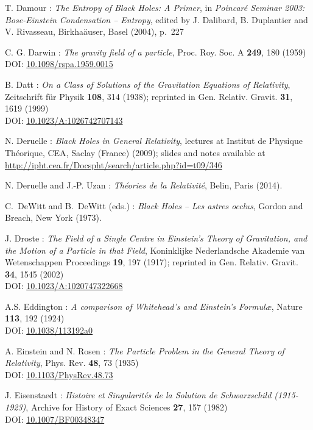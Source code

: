 \begin{thebibliography}{123}
T. Damour : {\em The Entropy of Black Holes: A Primer},
in {\em Poincaré Seminar 2003: Bose-Einstein Condensation -- Entropy},
edited by J. Dalibard, B. Duplantier and V. Rivasseau, Birkha\"auser, Basel (2004),
p.~227

C. G. Darwin : {\em The gravity field of a particle},
Proc. Roy. Soc. A {\bf 249}, 180 (1959)\\
DOI: \href{https://doi.org/10.1098/rspa.1959.0015}{10.1098/rspa.1959.0015}

B. Datt :
{\em On a Class of Solutions of the Gravitation Equations of Relativity},
Zeitschrift für Physik {\bf 108}, 314 (1938);
reprinted in Gen. Relativ. Gravit. {\bf 31}, 1619 (1999)\\
DOI: \href{https://doi.org/10.1023/10.1023/A:1026742707143}{10.1023/A:1026742707143}

N. Deruelle : {\em Black Holes in General Relativity}, lectures at
Institut de Physique Théorique, CEA, Saclay (France) (2009); slides and notes
available at \\
\url{http://ipht.cea.fr/Docspht/search/article.php?id=t09/346}

N. Deruelle and J.-P. Uzan : {\em Th\'eories de la Relativit\'e},
Belin, Paris (2014).

C.~DeWitt and B.~DeWitt (eds.) :
{\em Black Holes -- Les astres occlus},
Gordon and Breach, New York (1973).

J. Droste :
{\em The Field of a Single Centre in Einstein's Theory of Gravitation, and the Motion of a Particle in that Field},
Koninklijke Nederlandsche Akademie van Wetenschappen Proceedings {\bf 19}, 197 (1917);
reprinted in Gen. Relativ. Gravit. {\bf 34}, 1545 (2002)\\
DOI: \href{https://doi.org/10.1023/A:1020747322668}{10.1023/A:1020747322668}

A.S. Eddington : {\em A comparison of Whitehead's and Einstein's Formul\ae},
Nature {\bf 113}, 192 (1924) \\
DOI: \href{https://doi.org/10.1038/113192a0}{10.1038/113192a0}

A. Einstein and N. Rosen :
{\em The Particle Problem in the General Theory of Relativity},
Phys. Rev. {\bf 48}, 73 (1935) \\
DOI: \href{https://doi.org/10.1103/PhysRev.48.73}{10.1103/PhysRev.48.73}

J. Eisenstaedt :
{\em Histoire et Singularit\'es de la Solution de Schwarzschild (1915-1923)},
Archive for History of Exact Sciences {\bf 27}, 157 (1982) \\
DOI: \href{https://doi.org/10.1007/BF00348347}{10.1007/BF00348347}


\end{thebibliography}
